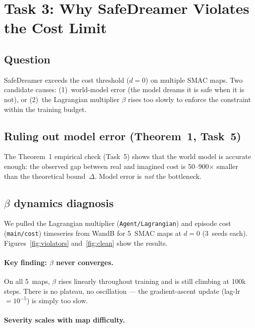\documentclass[10pt]{article}
\begin{document}
\section*{Task 3: Why SafeDreamer Violates the Cost Limit}

\subsection*{Question}
SafeDreamer exceeds the cost threshold ($d=0$) on multiple SMAC maps.
Two candidate causes: (1)~world-model error (the model dreams it is safe when
it is not), or (2)~the Lagrangian multiplier $\beta$ rises too slowly to
enforce the constraint within the training budget.

\subsection*{Ruling out model error (Theorem~1, Task~5)}
The Theorem~1 empirical check (Task~5) shows that the world model is accurate
enough: the observed gap between real and imagined cost is 50--900$\times$
smaller than the theoretical bound~$\Delta$.  Model error is \emph{not} the
bottleneck.

\subsection*{$\beta$ dynamics diagnosis}
We pulled the Lagrangian multiplier (\texttt{Agent/Lagrangian}) and episode
cost (\texttt{main/cost}) timeseries from WandB for 5~SMAC maps at $d=0$
(3~seeds each).  Figures~\ref{fig:violators} and~\ref{fig:clean} show the
results.

\paragraph{Key finding: $\beta$ never converges.}
On all 5~maps, $\beta$ rises linearly throughout training and is still
climbing at 100k steps.  There is no plateau, no oscillation --- the
gradient-ascent update (lag-lr${}=10^{-5}$) is simply too slow.

\paragraph{Severity scales with map difficulty.}
\end{document}
